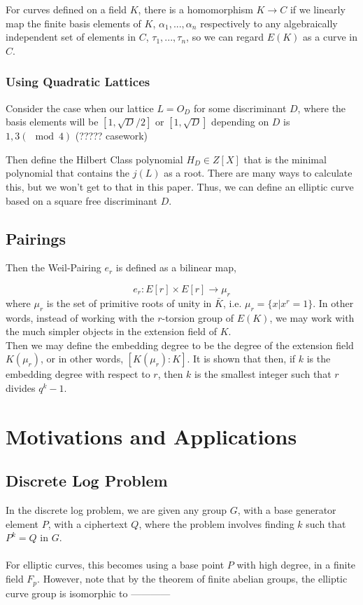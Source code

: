 \documentclass[12pt,twoside]{article}
\begin{document}
For curves defined on a field $K$, there is a homomorphism $K \rightarrow C$ if we linearly map the finite basis elements of $K$, $\alpha_{1}, ...,\alpha_{n}$ respectively to any algebraically independent set of elements in $C$, $\tau_{1},..., \tau_{n}$, so we can regard $E(K)$ as a curve in $C$.  

\subsubsection{Using Quadratic Lattices }
Consider the case when our lattice $L = O_{D}$ for some discriminant $D$, where the basis elements will be $[1, \sqrt{D}/2] $ or $[1, \sqrt{D}]$ depending on $D$ is $1, 3 (\mod 4)$ (????? casework) 

Then define the Hilbert Class polynomial $H_{D} \in Z[X]$ that is the minimal polynomial that contains the $j(L)$ as a root. There are many ways to calculate this, but we won't get to that in this paper. Thus, we can define an elliptic curve based on a square free discriminant $D$.  

\subsection{Pairings}
Then the Weil-Pairing $e_{r}$ is defined as a bilinear map,  

\begin{equation} 
e_{r}: E[r] \times E[r] \rightarrow \mu_{r}
\end{equation} where $\mu_{r}$ is the set of primitive roots of unity in $\bar{K}$, i.e. $\mu_{r} = \{x | x^{r} =1 \}$. In other words, instead of working with the $r$-torsion group of $E(K)$, we may work with the much simpler objects in the extension field of $K$. \\ 

Then we may define the embedding degree to be the degree of the extension field $K(\mu_{r})$, or in other words, $[K(\mu_{r}): K]$. It is shown that then, if $k$ is the embedding degree with respect to $r$, then $k$ is the smallest integer such that $r$ divides $q^{k} -1$. 
 


\section{Motivations and Applications} 

\subsection{Discrete Log Problem}
In the discrete log problem, we are given any group $G$, with a base generator element $P$, with a ciphertext $Q$, where the problem involves finding $k$ such that $P^{k} = Q$ in $G$. \\ \\
For elliptic curves, this becomes using a base point $P$ with high degree, in a finite field $F_{p}$. However, note that by the theorem of finite abelian groups, the elliptic curve group is isomorphic to ------------
\end{document}
